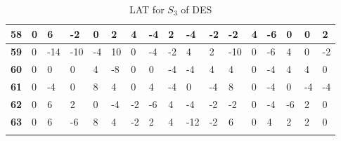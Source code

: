 \begin{longtable}[c]{|l|l|l|l|l|l|l|l|l|l|l|l|l|l|l|l|l|}
\textbf{58} & 0          & 6          & -2         & 0          & 2          & 4          & -4         & 2          & -4         & -2         & -2          & 4           & -6          & 0           & 0           & 2           \\ \hline
\textbf{59} & 0          & -14        & -10        & -4         & 10         & 0          & -4         & -2         & 4          & 2          & -10         & 0           & -6          & 4           & 0           & -2          \\ \hline
\textbf{60} & 0          & 0          & 0          & 4          & -8         & 0          & 0          & -4         & -4         & 4          & 4           & 0           & -4          & 4           & 4           & 0           \\ \hline
\textbf{61} & 0          & -4         & 0          & 8          & 4          & 0          & 4          & -4         & 0          & -4         & 8           & 0           & -4          & 0           & -4          & -4          \\ \hline
\textbf{62} & 0          & 6          & 2          & 0          & -4         & -2         & -6         & 4          & -4         & -2         & -2          & 0           & -4          & -6          & 2           & 0           \\ \hline
\textbf{63} & 0          & 6          & -6         & 8          & 4          & -2         & 2          & 4          & -12        & -2         & 6           & 0           & 4           & 2           & 2           & 0           \\ \hline
\caption{LAT for $S_3$ of DES}
\label{tbl:lat3}
\end{longtable}